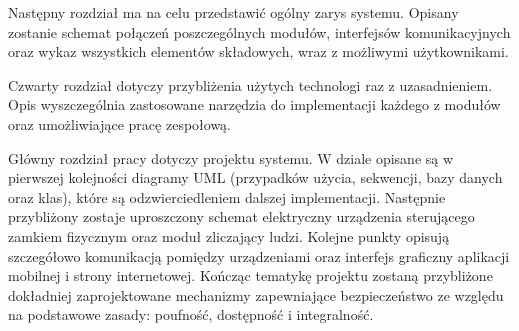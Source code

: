 Następny rozdział ma na celu przedstawić ogólny zarys systemu. Opisany zostanie schemat połączeń poszczególnych modułów, interfejsów komunikacyjnych oraz wykaz wszystkich elementów składowych, wraz z możliwymi użytkownikami.

Czwarty rozdział dotyczy przybliżenia użytych technologi raz z uzasadnieniem. Opis wyszczególnia zastosowane narzędzia do implementacji każdego z modułów oraz umożliwiające pracę zespołową.

Główny rozdział pracy dotyczy projektu systemu. W dziale opisane są w pierwszej kolejności diagramy UML (przypadków użycia, sekwencji, bazy danych oraz klas), które są odzwierciedleniem dalszej implementacji. Następnie przybliżony zostaje uproszczony schemat elektryczny urządzenia sterującego zamkiem fizycznym oraz moduł zliczający ludzi. Kolejne punkty opisują szczegółowo komunikacją pomiędzy urządzeniami oraz interfejs graficzny aplikacji mobilnej i strony internetowej. Kończąc tematykę projektu zostaną przybliżone dokładniej zaprojektowane mechanizmy zapewniające bezpieczeństwo ze względu na podstawowe zasady: poufność, dostępność i integralność.






\newpage
